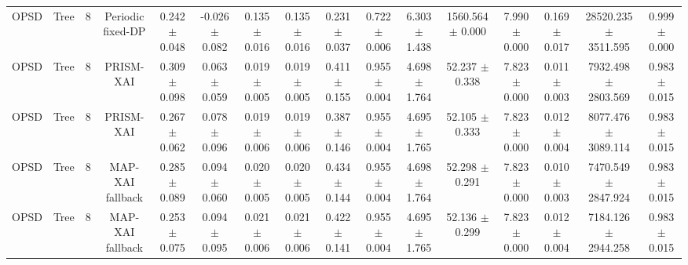 \begin{tabular}{lccccccccccccccc}
OPSD & Tree & 8 & Periodic fixed-DP & 0.242 $\pm$ 0.048 & -0.026 $\pm$ 0.082 & 0.135 $\pm$ 0.016 & 0.135 $\pm$ 0.016 & 0.231 $\pm$ 0.037 & 0.722 $\pm$ 0.006 & 6.303 $\pm$ 1.438 & 1560.564 $\pm$ 0.000 & 7.990 $\pm$ 0.000 & 0.169 $\pm$ 0.017 & 28520.235 $\pm$ 3511.595 & 0.999 $\pm$ 0.000 \\
OPSD & Tree & 8 & PRISM-XAI & 0.309 $\pm$ 0.098 & 0.063 $\pm$ 0.059 & 0.019 $\pm$ 0.005 & 0.019 $\pm$ 0.005 & 0.411 $\pm$ 0.155 & 0.955 $\pm$ 0.004 & 4.698 $\pm$ 1.764 & 52.237 $\pm$ 0.338 & 7.823 $\pm$ 0.000 & 0.011 $\pm$ 0.003 & 7932.498 $\pm$ 2803.569 & 0.983 $\pm$ 0.015 \\
OPSD & Tree & 8 & PRISM-XAI & 0.267 $\pm$ 0.062 & 0.078 $\pm$ 0.096 & 0.019 $\pm$ 0.006 & 0.019 $\pm$ 0.006 & 0.387 $\pm$ 0.146 & 0.955 $\pm$ 0.004 & 4.695 $\pm$ 1.765 & 52.105 $\pm$ 0.333 & 7.823 $\pm$ 0.000 & 0.012 $\pm$ 0.004 & 8077.476 $\pm$ 3089.114 & 0.983 $\pm$ 0.015 \\
OPSD & Tree & 8 & MAP-XAI fallback & 0.285 $\pm$ 0.089 & 0.094 $\pm$ 0.060 & 0.020 $\pm$ 0.005 & 0.020 $\pm$ 0.005 & 0.434 $\pm$ 0.144 & 0.955 $\pm$ 0.004 & 4.698 $\pm$ 1.764 & 52.298 $\pm$ 0.291 & 7.823 $\pm$ 0.000 & 0.010 $\pm$ 0.003 & 7470.549 $\pm$ 2847.924 & 0.983 $\pm$ 0.015 \\
OPSD & Tree & 8 & MAP-XAI fallback & 0.253 $\pm$ 0.075 & 0.094 $\pm$ 0.095 & 0.021 $\pm$ 0.006 & 0.021 $\pm$ 0.006 & 0.422 $\pm$ 0.141 & 0.955 $\pm$ 0.004 & 4.695 $\pm$ 1.765 & 52.136 $\pm$ 0.299 & 7.823 $\pm$ 0.000 & 0.012 $\pm$ 0.004 & 7184.126 $\pm$ 2944.258 & 0.983 $\pm$ 0.015 \\
\bottomrule
\end{tabular}
